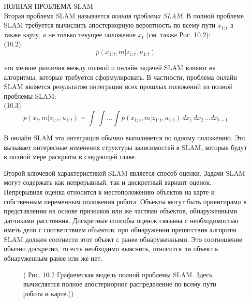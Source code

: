 \documentclass[10pt,a4paper]{article}
\begin{document}
ПОЛНАЯ ПРОБЛЕМА SLAM\\ 
Вторая проблема SLAM называется \textit{полная проблема SLAM}. В полной проблеме SLAM требуется вычислить апостериорную вероятность по всему пути $x_{1:t}$ а также карту, а не только текущее положение $x_t$ (см. также Рис. 10.2):\\

(10.2)
$$p(x_{1:t},m|z_{1:t},u_{1:t})$$

эти мелкие различия между полной и онлайн задачей SLAM влияют на алгоритмы, которые требуется сформулировать. В частности, проблема онлайн SLAM является результатом интеграции всех прошлых положений из полной проблемы SLAM:\\

(10.3)
$$p(x_t,m|z_{1:t},u_{1:t})=\int\,\int...\int p(x_{1:t},m|z_{1:t},u_{1:t})\,dx_1\,dx_2\,...dx_{t-1}$$

В онлайн SLAM эта интеграция обычно выполняется по одному положению. Это вызывает интересные изменения структуры зависимостей в SLAM, которые будут в полной мере раскрыты в следующей главе.

Второй ключевой характеристикой SLAM является способ оценки. Задачи SLAM могут содержать как непрерывный, так и дискретный вариант оценок. Непрерывная оценка относится к местоположению объектов на карте и собственным переменным положения робота. Объекты могут быть ориентирами в представлении на основе признаков или же частями объектов, обнаруженными датчиками расстояния. Дискретные способы оценок связаны с необходимостью иметь дело с соответствием объектов: при обнаружении препятствия алгоритм SLAM должен соотнести этот объект с ранее обнаруженными. Это соотношение обычно дискретно, то есть необходимо выяснить, относится ли объект к обнаруженным ранее или же нет.

\begin{figure}[H]
	\caption{ ( Рис. 10.2 Графическая модель полной проблемы SLAM. Здесь вычисляется полное апостериорное распределение по всему пути робота и карте.))}
	\label{fig:102orig}
\end{figure}
\end{document}
